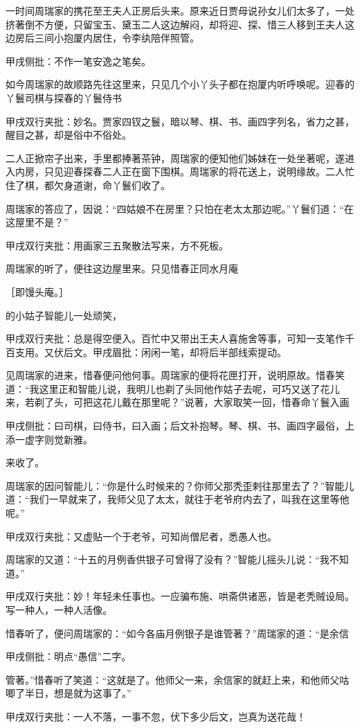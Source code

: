 \begin{parag}
    一时间周瑞家的携花至王夫人正房后头来。原来近日贾母说孙女儿们太多了，一处挤著倒不方便，只留宝玉、黛玉二人这边解闷，却将迎、探、惜三人移到王夫人这边房后三间小抱厦内居住，令李纨陪伴照管。\begin{note}甲戌侧批：不作一笔安逸之笔矣。\end{note}如今周瑞家的故顺路先往这里来，只见几个小丫头子都在抱厦内听呼唤呢。迎春的丫鬟司棋与探春的丫鬟侍书\begin{note}甲戌双行夹批：妙名。贾家四钗之鬟，暗以琴、棋、书、画四字列名，省力之甚，醒目之甚，却是俗中不俗处。\end{note}二人正掀帘子出来，手里都捧著茶钟，周瑞家的便知他们姊妹在一处坐著呢，遂进入内房，只见迎春探春二人正在窗下围棋。周瑞家的将花送上，说明缘故。二人忙住了棋，都欠身道谢，命丫鬟们收了。
\end{parag}


\begin{parag}
    周瑞家的答应了，因说：“四姑娘不在房里？只怕在老太太那边呢。”丫鬟们道：“在这屋里不是？”\begin{note}甲戌双行夹批：用画家三五聚散法写来，方不死板。\end{note}周瑞家的听了，便往这边屋里来。只见惜春正同水月庵\begin{note}［即馒头庵。］\end{note}的小姑子智能儿一处顽笑，\begin{note}甲戌双行夹批：总是得空便入。百忙中又带出王夫人喜施舍等事，可知一支笔作千百支用。又伏后文。甲戌眉批：闲闲一笔，却将后半部线索提动。\end{note}见周瑞家的进来，惜春便问他何事。周瑞家的便将花匣打开，说明原故。惜春笑道：“我这里正和智能儿说，我明儿也剃了头同他作姑子去呢，可巧又送了花儿来，若剃了头，可把这花儿戴在那里呢？”说著，大家取笑一回，惜春命丫鬟入画\begin{note}甲戌侧批：曰司棋，曰侍书，曰入画；后文补抱琴。琴、棋、书、画四字最俗，上添一虚字则觉新雅。\end{note}来收了。
\end{parag}


\begin{parag}
    周瑞家的因问智能儿：“你是什么时候来的？你师父那秃歪剌往那里去了？”智能儿道：“我们一早就来了，我师父见了太太，就往于老爷府内去了，叫我在这里等他呢。”\begin{note}甲戌双行夹批：又虚贴一个于老爷，可知尚僧尼者，悉愚人也。\end{note}周瑞家的又道：“十五的月例香供银子可曾得了没有？”智能儿摇头儿说：“我不知道。”\begin{note}甲戌双行夹批：妙！年轻未任事也。一应骗布施、哄斋供诸恶，皆是老秃贼设局。写一种人，一种人活像。\end{note}惜春听了，便问周瑞家的：“如今各庙月例银子是谁管著？”周瑞家的道：“是余信\begin{note}甲戌侧批：明点“愚信”二字。\end{note}管著。”惜春听了笑道：“这就是了。他师父一来，余信家的就赶上来，和他师父咕唧了半日，想是就为这事了。”\begin{note}甲戌双行夹批：一人不落，一事不忽，伏下多少后文，岂真为送花哉！\end{note}
\end{parag}


